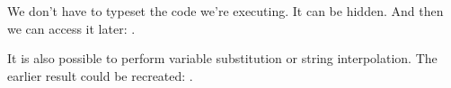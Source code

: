 \documentclass[12pt]{scrartcl}
\begin{document}
We don't have to typeset the code we're executing.  It can be hidden. And then we can access it later:  .

It is also possible to perform variable substitution or string interpolation.  The earlier result could be recreated:  .
\end{document}
